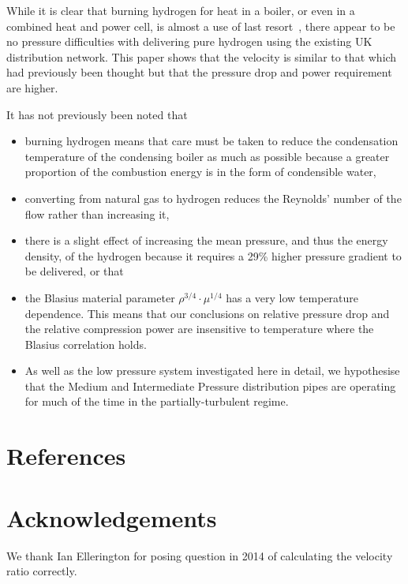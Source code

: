 \documentclass[5p]{elsarticle} %
\begin{document}
While it is clear that burning hydrogen for heat in a boiler, or even in a combined heat and power cell, is almost a use of last resort~\citep{Rosenow2024,Liebreich2021}, there appear to be no pressure difficulties with delivering pure hydrogen using the existing UK distribution network. This paper shows that the velocity is similar to that which had previously been thought but that the pressure drop and power requirement are higher.

It has not previously been noted that 
\begin{itemize}

    \item burning hydrogen means that care must be taken to reduce the condensation temperature of the condensing boiler as much as possible because a greater proportion of the combustion energy is in the form of condensible water,
    \item converting from natural gas to hydrogen reduces the Reynolds' number of the flow rather than increasing it,    \item there is a slight effect of increasing the mean pressure, and thus the energy density, of the hydrogen because it requires a 29\% higher pressure gradient to be delivered, or that
    \item the Blasius material parameter $\rho^{3/4} \cdot \mu^{1/4}$ has a very low temperature dependence. This means that our conclusions on relative pressure drop and the relative compression power  are insensitive to temperature where the Blasius correlation holds.
    \item As well as the low pressure system investigated here in detail, we hypothesise that  the Medium and Intermediate Pressure distribution pipes are operating for much of the time in the partially-turbulent regime.
\end{itemize}



\section{References}



\section*{Acknowledgements}
\label{sec:ending}

We thank Ian Ellerington for posing question in 2014 of calculating the velocity ratio correctly.
\end{document}
